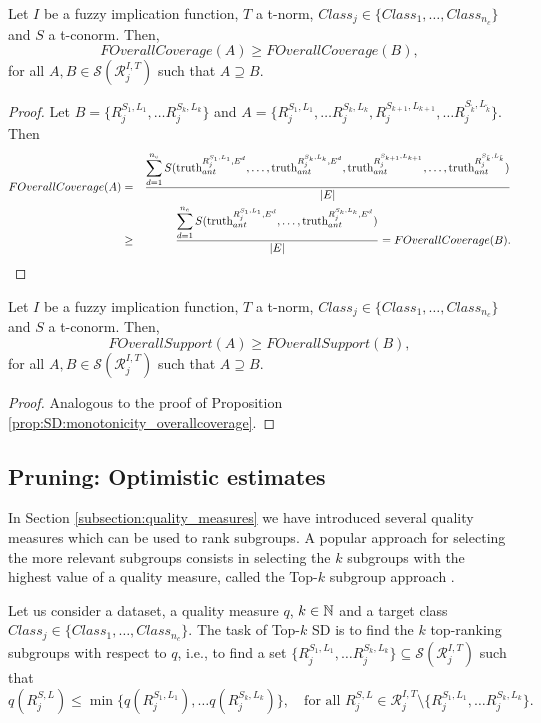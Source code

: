 \begin{proposition}\label{prop:SD:monotonicity_overallcoverage}
	Let $I$ be a fuzzy implication function, $T$ a t-norm, $Class_j \in \{Class_1,\dots,Class_{n_c}\}$ and $S$ a t-conorm. Then, 
	$$
	FOverallCoverage(A) \geq FOverallCoverage(B),
	$$
	for all $A,B  \in \mathcal{S}(\mathcal{R}^{I,T}_j)$ such that $A \supseteq B$.
\end{proposition}
\begin{proof}
Let $B=\{R^{S_1,L_1}_{j},\dots R^{S_k,L_k}_{j}\}$ and $A=\{R^{S_1,L_1}_{j},\dots R^{S_k,L_k}_{j},R^{S_{k+1},L_{k+1}}_{j}, \dots R^{S_{\tilde{k}},L_{\tilde{k}}}_{j}\}$. Then
\begin{eqnarray*}
FOverallCoverage(A) &=& \frac{ \displaystyle \sum_{d=1}^{n_e}S(\text{truth}_{ant}^{R^{S_1,L_1}_j,E^d},\dots, \text{truth}_{ant}^{R^{S_k,L_k}_j,E^d},\text{truth}_{ant}^{R^{S_{k+1},L_{k+1}}_{j}}, \dots ,\text{truth}_{ant}^{R^{S_{\tilde{k}},L_{\tilde{k}}}_{j}})}{|E|} \\
&\geq& \frac{ \displaystyle \sum_{d=1}^{n_e}S(\text{truth}_{ant}^{R^{S_1,L_1}_j,E^d},\dots, \text{truth}_{ant}^{R^{S_k,L_k}_j,E^d})}{|E|} = FOverallCoverage(B). \qedhere
\end{eqnarray*}
\end{proof}
\begin{proposition}
	Let $I$ be a fuzzy implication function, $T$ a t-norm, $Class_j \in \{Class_1,\dots,Class_{n_c}\}$ and $S$ a t-conorm. Then, 
	$$
	FOverallSupport(A) \geq FOverallSupport(B),
	$$
	for all $A,B  \in \mathcal{S}(\mathcal{R}^{I,T}_j)$ such that $A \supseteq B$.
\end{proposition}
\begin{proof}
	Analogous to the proof of Proposition \ref{prop:SD:monotonicity_overallcoverage}.
\end{proof}
	
\subsection{Pruning: Optimistic estimates}\label{subsection:optimistic_estimates}

In Section \ref{subsection:quality_measures} we have introduced several quality measures which can be used to rank subgroups. A popular approach for selecting the more relevant subgroups consists in selecting the $k$ subgroups with the highest value of a quality measure, called the Top-$k$ subgroup approach \cite{Atzmueller2015}.

\begin{definition}
	Let us consider a dataset, a quality measure $q$, $k \in \mathbb{N}$ and a target class $Class_j \in \{Class_1,\dots,Class_{n_c}\}$. The task of Top-$k$ SD is to find the $k$ top-ranking subgroups with respect to $q$, i.e., to find a set $\{R^{S_1,L_1}_{j},\dots R^{S_k,L_k}_{j}\} \subseteq \mathcal{S}(\mathcal{R}^{I,T}_j)$ such that
	$$q(R^{S,L}_j) \leq \min \{q(R^{S_1,L_1}_{j}), \dots q(R^{S_k,L_k}_{j})\}, \quad \text{for all } R^{S,L}_j \in \mathcal{R}^{I,T}_j \setminus \{R^{S_1,L_1}_{j},\dots R^{S_k,L_k}_{j}\}.$$
\end{definition}

